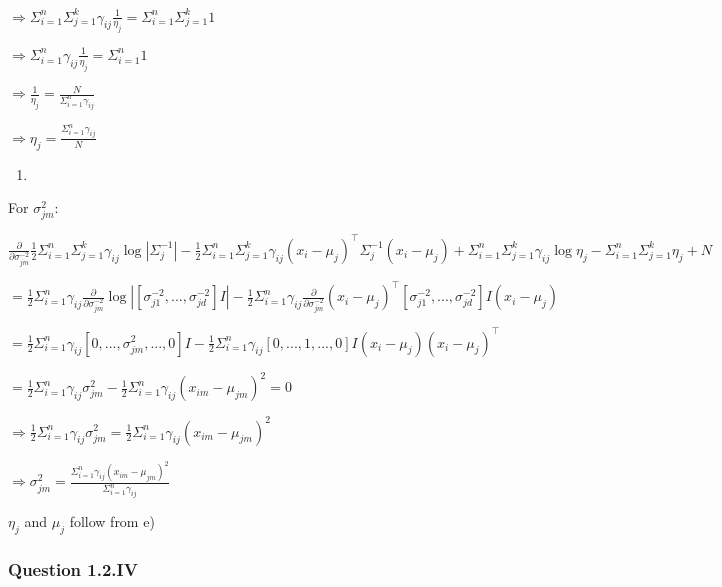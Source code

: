 \documentclass[
]{article}
\providecommand{\tightlist}{%
  \setlength{\itemsep}{0pt}\setlength{\parskip}{0pt}}
\begin{document}
\(\Rightarrow \Sigma_{i=1}^n \Sigma_{j=1}^k \gamma_{ij} \frac{1}{\eta_j} = \Sigma_{i=1}^n \Sigma_{j=1}^k 1\)

\(\Rightarrow \Sigma_{i=1}^n \gamma_{ij} \frac{1}{\eta_j} = \Sigma_{i=1}^n 1\)

\(\Rightarrow \frac{1}{\eta_j} = \frac{N}{\Sigma_{i=1}^n \gamma_{ij}}\)

\(\Rightarrow \eta_j = \frac{\Sigma_{i=1}^n \gamma_{ij}}{N}\)

\begin{enumerate}
\def\labelenumi{\alph{enumi})}
\setcounter{enumi}{5}
\tightlist
\item
\end{enumerate}

For \(\sigma^2_{jm}:\)

\(\frac{\partial}{\partial \sigma^{-2}_{jm}}\frac{1}{2}\Sigma_{i=1}^n \Sigma_{j=1}^k \gamma_{ij} \log |\Sigma_j^{-1}|-\frac{1}{2}\Sigma_{i=1}^n \Sigma_{j=1}^k \gamma_{ij}(x_i-\mu_j)^\top \Sigma_j^{-1}(x_i-\mu_j) + \Sigma_{i=1}^n \Sigma_{j=1}^k \gamma_{ij} \log \eta_j - \Sigma_{i=1}^n \Sigma_{j=1}^k \eta_j + N\)

\(= \frac{1}{2}\Sigma_{i=1}^n \gamma_{ij} \frac{\partial}{\partial \sigma^{-2}_{jm}} \log |[\sigma^{-2}_{j1},...,\sigma^{-2}_{jd}]I|-\frac{1}{2}\Sigma_{i=1}^n \gamma_{ij}\frac{\partial}{\partial \sigma^{-2}_{jm}}(x_i-\mu_j)^\top [\sigma^{-2}_{j1},...,\sigma^{-2}_{jd}]I(x_i-\mu_j)\)

\(= \frac{1}{2}\Sigma_{i=1}^n \gamma_{ij} [0,...,\sigma^2_{jm},...,0]I-\frac{1}{2}\Sigma_{i=1}^n \gamma_{ij} [0,...,1,...,0]I(x_i-\mu_j)(x_i-\mu_j)^\top\)

\(= \frac{1}{2}\Sigma_{i=1}^n\gamma_{ij} \sigma^2_{jm}-\frac{1}{2}\Sigma_{i=1}^n \gamma_{ij} (x_{im}-\mu_{jm})^2 = 0\)

\(\Rightarrow \frac{1}{2}\Sigma_{i=1}^n\gamma_{ij} \sigma^2_{jm} = \frac{1}{2}\Sigma_{i=1}^n\gamma_{ij} (x_{im}-\mu_{jm})^2\)

\(\Rightarrow \sigma^2_{jm} = \frac{\Sigma_{i=1}^n\gamma_{ij} (x_{im}-\mu_{jm})^2}{\Sigma_{i=1}^n \gamma_{ij}}\)

\(\eta_j\) and \(\mu_j\) follow from e)

\hypertarget{question-1.2.iv}{%
\subsubsection{Question 1.2.IV}\label{question-1.2.iv}}
\end{document}
